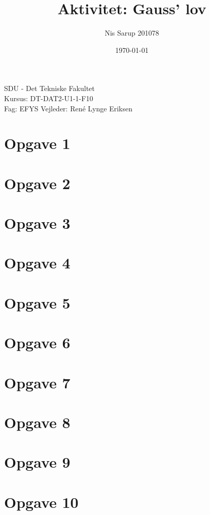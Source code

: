 \documentclass[a4wide,10pt]{article}
\begin{document}
\title{Aktivitet: Gauss’ lov}
\author{Nis Sarup 201078}
\date{\today}
\maketitle
\begin{center}
	SDU - Det Tekniske Fakultet\\
	Kursus: DT-DAT2-U1-1-F10\\
	Fag: EFYS
	Vejleder: René Lynge Eriksen \\
\end{center}
\newpage

\tableofcontents
\newpage

\section{Opgave 1} %
\label{sec:opgave_1}

\newpage

\section{Opgave 2} %
\label{sec:opgave_2}


\section{Opgave 3} %
\label{sec:opgave_3}


\section{Opgave 4} %
\label{sec:opgave_4}

\newpage

\section{Opgave 5} %
\label{sec:opgave_5}


\section{Opgave 6} %
\label{sec:opgave_6}


\section{Opgave 7} %
\label{sec:opgave_7}

\newpage

\section{Opgave 8} %
\label{sec:opgave_8}


\section{Opgave 9} %
\label{sec:opgave_9}


\section{Opgave 10} %
\label{sec:opgave_10}

\end{document}

